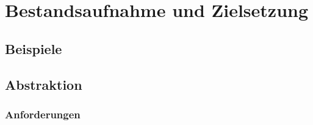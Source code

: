 \chapter{Bestandsaufnahme und Zielsetzung}
\label{chapter:bestandsaufnahme}
\section{Beispiele}
\section{Abstraktion}
\subsection{Anforderungen}